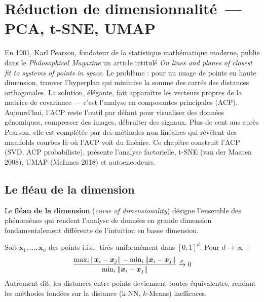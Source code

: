 \chapter{R\'eduction de dimensionnalit\'e~--- PCA, t-SNE, UMAP}
\label{ch:reduction}

En 1901, Karl Pearson, fondateur de la statistique mathématique moderne, publie dans le \emph{Philosophical Magazine} un article intitulé \emph{On lines and planes of closest fit to systems of points in space}. Le problème : pour un nuage de points en haute dimension, trouver l'hyperplan qui minimise la somme des carrés des distances orthogonales. La solution, élégante, fait apparaître les vecteurs propres de la matrice de covariance --- c'est l'analyse en composantes principales (ACP). Aujourd'hui, l'ACP reste l'outil par défaut pour visualiser des données génomiques, compresser des images, débruiter des signaux. Plus de cent ans après Pearson, elle est complétée par des méthodes non linéaires qui révèlent des manifolds courbes là où l'ACP voit du linéaire. Ce chapitre construit l'ACP (SVD, ACP probabiliste), présente l'analyse factorielle, t-SNE (van der Maaten 2008), UMAP (McInnes 2018) et autoencodeurs.

\section{Le fl\'eau de la dimension}
\label{sec:curse}

\begin{definition}
Le \textbf{fl\'eau de la dimension} (\emph{curse of dimensionality}) d\'esigne
l'ensemble des ph\'enom\`enes qui rendent l'analyse de donn\'ees en grande
dimension fondamentalement diff\'erente de l'intuition en basse dimension.
\end{definition}

\begin{theoreme}
Soit $\bm{x}_1, \ldots, \bm{x}_n$ des points i.i.d.\ tir\'es uniform\'ement
dans $[0,1]^d$. Pour $d \to \infty$~:
\begin{equation}
  \frac{\max_i \left\| \bm{x}_i - \bm{x}_j \right\| - \min_i \left\| \bm{x}_i -
  \bm{x}_j \right\|}{\min_i \left\| \bm{x}_i - \bm{x}_j \right\|} \xrightarrow{p} 0
\end{equation}
Autrement dit, les distances entre points deviennent toutes \'equivalentes,
rendant les m\'ethodes fond\'ees sur la distance (k-NN, $k$-Means) inefficaces.
\end{theoreme}

